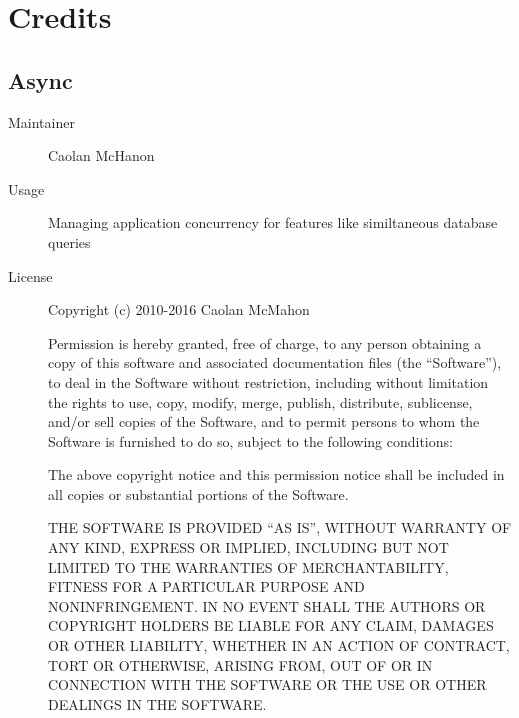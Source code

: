 \chapter{Credits}
\label{chapter:credits}
  \section*{Async}
    \begin{description}
      \item[Maintainer] Caolan McHanon
      \item[Usage] Managing application concurrency for features like similtaneous database queries
      \item[License] \scriptsize Copyright (c) 2010-2016 Caolan McMahon

        Permission is hereby granted, free of charge, to any person obtaining a copy
        of this software and associated documentation files (the ``Software''), to deal
        in the Software without restriction, including without limitation the rights
        to use, copy, modify, merge, publish, distribute, sublicense, and/or sell
        copies of the Software, and to permit persons to whom the Software is
        furnished to do so, subject to the following conditions:

        The above copyright notice and this permission notice shall be included in
        all copies or substantial portions of the Software.

        THE SOFTWARE IS PROVIDED ``AS IS'', WITHOUT WARRANTY OF ANY KIND, EXPRESS OR
        IMPLIED, INCLUDING BUT NOT LIMITED TO THE WARRANTIES OF MERCHANTABILITY,
        FITNESS FOR A PARTICULAR PURPOSE AND NONINFRINGEMENT. IN NO EVENT SHALL THE
        AUTHORS OR COPYRIGHT HOLDERS BE LIABLE FOR ANY CLAIM, DAMAGES OR OTHER
        LIABILITY, WHETHER IN AN ACTION OF CONTRACT, TORT OR OTHERWISE, ARISING FROM,
        OUT OF OR IN CONNECTION WITH THE SOFTWARE OR THE USE OR OTHER DEALINGS IN
        THE SOFTWARE.
    \end{description}

